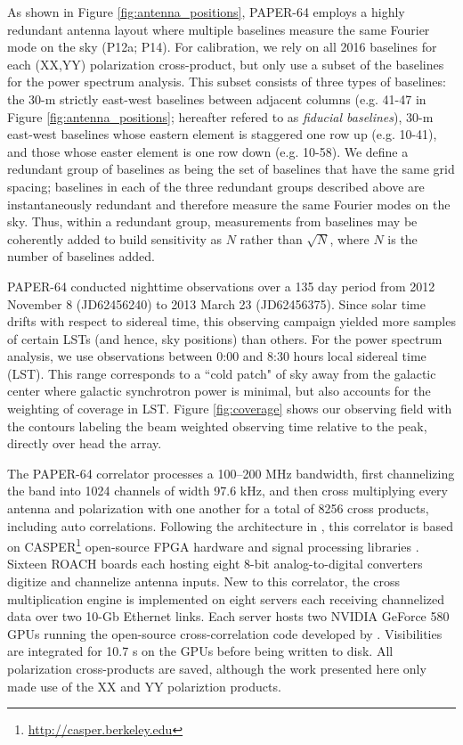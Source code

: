 \documentclass[twocolumn,numberedappendix]{emulateapj} \shorttitle{PSA64}
\begin{document}
As shown in Figure \ref{fig:antenna_positions}, PAPER-64 employs
a highly redundant antenna layout where multiple baselines measure
the same Fourier mode on the sky (P12a; P14).
For calibration, we rely on all 2016 baselines for each (XX,YY) polarization cross-product,
but only use a subset of the baselines for the power spectrum
analysis. This subset consists of three types of baselines: the 30-m
strictly east-west baselines between adjacent columns (e.g. 41-47
in Figure \ref{fig:antenna_positions}; hereafter refered to 
as {\it fiducial baselines}), 30-m east-west baselines
whose eastern element is staggered one row up (e.g. 10-41), and
those whose easter element is one row down (e.g. 10-58).
We define a redundant group of
baselines as being the set of baselines that have the same grid spacing;
baselines in each
of the three redundant groups described above are instantaneously redundant and
therefore measure the same Fourier modes on the sky. Thus, within a redundant group,
measurements from baselines may be 
coherently added to build sensitivity as $N$ rather than
$\sqrt{N}$, where $N$ is the number of baselines added.  

PAPER-64 conducted nighttime observations over a 135 day period 
from 2012 November 8 (JD62456240) to 2013 March 23 (JD62456375). 
Since solar time drifts with respect to sidereal time, this observing campaign
yielded more samples of certain LSTs (and hence, sky positions) than others. 
For the power spectrum analysis, we use observations between 0:00 and 8:30 hours
local sidereal time (LST).  This range corresponds to
a ``cold patch" of sky away from the galactic center where galactic synchrotron power is minimal,
but also accounts for the weighting of coverage in LST.
Figure \ref{fig:coverage} shows our observing field with the contours labeling
the beam weighted observing time relative to the peak, directly over head the
array.

The PAPER-64 correlator processes a 100--200 MHz bandwidth, first
channelizing the band into 1024 channels of width 97.6 kHz, and then
cross multiplying every antenna and polarization with one another for a total of
8256 cross products, including auto correlations.  Following the architecture 
in \citet{parsons_et_al2008}, this
correlator is based on CASPER\footnote{\url{http://casper.berkeley.edu}} open-source
FPGA hardware and signal processing libraries \citep{parsons_et_al2006}.  
Sixteen ROACH boards each hosting eight 8-bit analog-to-digital
converters digitize and channelize antenna inputs. New to this correlator,
the cross multiplication engine is implemented on eight servers each receiving
channelized data over two 10-Gb Ethernet links.  Each server hosts
two NVIDIA GeForce 580 GPUs running the open-source cross-correlation code developed
by \citet{clark_et_al2013}.
Visibilities are integrated for 10.7 s on the GPUs before
being written to disk.  All polarization cross-products are saved, although the
work presented here only made use of the XX and YY polariztion products.
\end{document}
